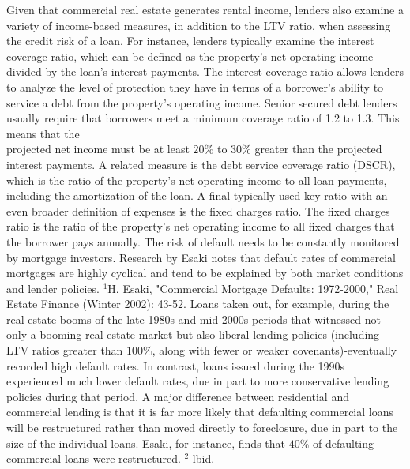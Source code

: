 \documentclass[11pt]{article}
\begin{document}
Given that commercial real estate generates rental income, lenders also examine a variety of income-based measures, in addition to the LTV ratio, when assessing the credit risk of a loan. For instance, lenders typically examine the interest coverage ratio, which can be defined as the property's net operating income divided by the loan's interest payments. The interest coverage ratio allows lenders to analyze the level of protection they have in terms of a borrower's ability to service a debt from the property's operating income. Senior secured debt lenders usually require that borrowers meet a minimum coverage ratio of 1.2 to 1.3. This means that the\\
projected net income must be at least $20 \%$ to $30 \%$ greater than the projected interest payments. A related measure is the debt service coverage ratio (DSCR), which is the ratio of the property's net operating income to all loan payments, including the amortization of the loan. A final typically used key ratio with an even broader definition of expenses is the fixed charges ratio. The fixed charges ratio is the ratio of the property's net operating income to all fixed charges that the borrower pays annually. The risk of default needs to be constantly monitored by mortgage investors. Research by Esaki notes that default rates of commercial mortgages are highly cyclical and tend to be explained by both market conditions and lender policies. ${ }^{1} \mathrm{H}$. Esaki, "Commercial Mortgage Defaults: 1972-2000," Real Estate Finance (Winter 2002): 43-52. Loans taken out, for example, during the real estate booms of the late 1980s and mid-2000s-periods that witnessed not only a booming real estate market but also liberal lending policies (including LTV ratios greater than $100 \%$, along with fewer or weaker covenants)-eventually recorded high default rates. In contrast, loans issued during the 1990s experienced much lower default rates, due in part to more conservative lending policies during that period. A major difference between residential and commercial lending is that it is far more likely that defaulting commercial loans will be restructured rather than moved directly to foreclosure, due in part to the size of the individual loans. Esaki, for instance, finds that $40 \%$ of defaulting commercial loans were restructured. ${ }^{2}$ lbid.
\end{document}
